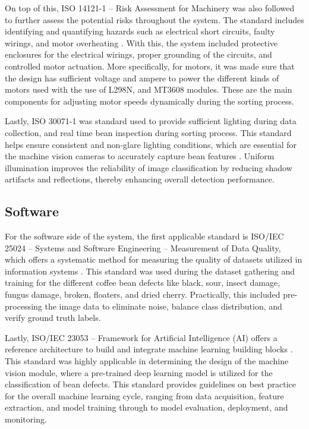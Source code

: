 On top of this, ISO 14121-1 – Risk Assessment for Machinery was also followed to further assess the potential risks throughout the system. The standard includes identifying and quantifying hazards such as electrical short circuits, faulty wirings, and motor overheating \cite{International_Organization_for_Standardization_2007}. With this, the system included protective enclosures for the electrical wirings, proper grounding of the circuits, and controlled motor actuation. More specifically, for motors, it was made sure that the design has sufficient voltage and ampere to power the different kinds of motors used with the use of L298N, and MT3608 modules. These are the main components for adjusting motor speeds dynamically during the sorting process.

Lastly, ISO 30071-1 was standard used to provide sufficient lighting during data collection, and real time bean inspection during sorting process. This standard helps ensure consistent and non-glare lighting conditions, which are essential for the machine vision cameras to accurately capture bean features \cite{International_Organization_for_Standardization_2019}. Uniform illumination improves the reliability of image classification by reducing shadow artifacts and reflections, thereby enhancing overall detection performance.

\subsection{Software}

For the software side of the system, the first applicable standard is ISO/IEC 25024 – Systems and Software Engineering – Measurement of Data Quality, which offers a systematic method for measuring the quality of datasets utilized in information systems \cite{International_Organization_for_Standardization_2015}. This standard was used during the dataset gathering and training for the different coffee bean defects like black, sour, insect damage, fungus damage, broken, floaters, and dried cherry. Practically, this included pre-processing the image data to eliminate noise, balance class distribution, and verify ground truth labels. 

Lastly, ISO/IEC 23053 – Framework for Artificial Intelligence (AI) offers a reference architecture to build and integrate machine learning building blocks \cite{International_Organization_for_Standardization_2022}. This standard was highly applicable in determining the design of the machine vision module, where a pre-trained deep learning model is utilized for the classification of bean defects. This standard provides guidelines on best practice for the overall machine learning cycle, ranging from data acquisition, feature extraction, and model training through to model evaluation, deployment, and monitoring. 

